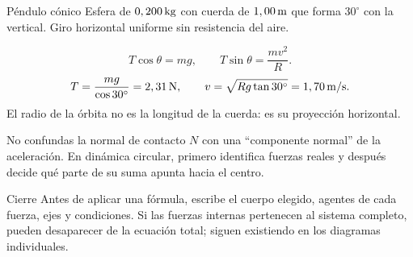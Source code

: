 \documentclass[10pt,a4paper]{article}
\begin{document}
\begin{examplebox}{P\'endulo c\'onico}
Esfera de $0,200\,\mathrm{kg}$ con cuerda de $1,00\,\mathrm{m}$ que forma $30^\circ$ con la vertical. Giro horizontal uniforme sin resistencia del aire.
\begin{center}
\end{center}
\[
T\cos\theta=mg,\qquad T\sin\theta=\frac{mv^2}{R}.
\]
\[
T=\frac{mg}{\cos30^\circ}=2,31\,\mathrm{N},\qquad
v=\sqrt{Rg\tan30^\circ}=1,70\,\mathrm{m/s}.
\]
El radio de la \'orbita no es la longitud de la cuerda: es su proyecci\'on horizontal.
\end{examplebox}

\begin{warnbox}
No confundas la normal de contacto $N$ con una ``componente normal'' de la aceleraci\'on. En din\'amica circular, primero identifica fuerzas reales y despu\'es decide qu\'e parte de su suma apunta hacia el centro.
\end{warnbox}

\begin{lessoncard}{Cierre}
Antes de aplicar una f\'ormula, escribe el cuerpo elegido, agentes de cada fuerza, ejes y condiciones. Si las fuerzas internas pertenecen al sistema completo, pueden desaparecer de la ecuaci\'on total; siguen existiendo en los diagramas individuales.
\end{lessoncard}
\end{document}
